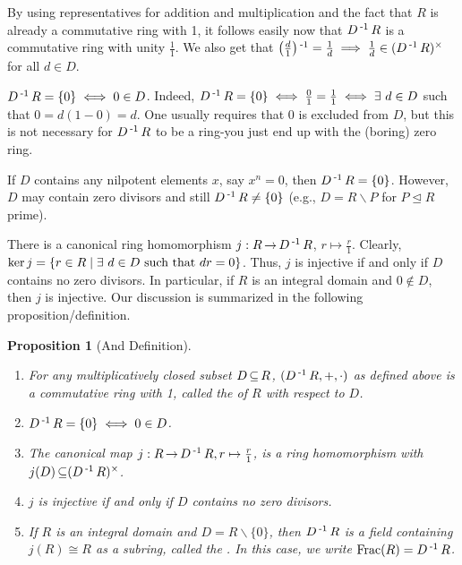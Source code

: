 \documentclass[11pt]{book}
\newcounter{counter}
\newtheorem{proposition}[counter]{Proposition}   \newtheorem{problem}[counter]{Problem}   \newtheorem*{proposition*}{Proposition}   \newtheorem*{lemma*}{Lemma}
\theoremstyle{definition}   \newtheorem{defn}[counter]{Definition} %
\newcommand{\bs}{\backslash}   \newcommand{\A}{\mathcal{A}}   \newcommand{\sy}{\textnormal{Syl}}   \newcommand{\size}[1]{\left| #1 \right|}
\newcommand{\nsg}{\mathrel{\unlhd}}   \newcommand{\ind}{\parindent24pt}   \newcommand{\vn}{\varnothing}
\DeclareMathOperator{\ra}{\rightarrow}   \DeclareMathOperator{\Poly}{\mathbf{P}}   \DeclareMathOperator{\spn}{\textnormal{span}}   \DeclareMathOperator{\aut}{\textnormal{Aut}}
\newcommand{\vs}{\vspace{8pt}}
\numberwithin{counter}{chapter}
\begin{document}
By using representatives for addition and multiplication and the fact that $R$ is already a commutative ring with 1, it follows easily now that $D\operatorname{^{-1}} R$ is a commutative ring with unity $\frac{1}{1}$. We also get that $\left( \frac{d}{1} \right)\operatorname{^{-1}} = \frac{1}{d} \implies \frac{1}{d} \in (D\operatorname{^{-1}} R)^{\times}$ for all $d \in D$.

\vs

\begin{remark*}
$D\operatorname{^{-1}} R = \{0\} \iff 0 \in D$. Indeed, $D\operatorname{^{-1}} R = \{0\} \iff \frac{0}{1} = \frac{1}{1} \iff \exists \ d \in D$ such that $0 = d(1-0) = d$. One usually requires that $0$ is excluded from $D$, but this is not necessary for $D\operatorname{^{-1}} R$ to be a ring-you just end up with the (boring) zero ring.

If $D$ contains any nilpotent elements $x$, say $x^n = 0$, then $D\operatorname{^{-1}} R = \{0\}$. However, $D$ may contain zero divisors and still $D\operatorname{^{-1}} R \ne \{0\}$ (e.g., $D = R \bs P$ for $P \nsg R$ prime).
\end{remark*}

\vs

There is a canonical ring homomorphism $j : R \ra D\inv R$, $r \mapsto \frac{r}{1}$. Clearly, $\ker j = \{r \in R \mid \exists \ d \in D \textnormal{ such that } dr = 0\}$. Thus, $j$ is injective if and only if $D$ contains no zero divisors. In particular, if $R$ is an integral domain and $0 \notin D$, then $j$ is injective. Our discussion is summarized in the following proposition/definition.

\vs

\begin{proposition}[And Definition]
\
\begin{enumerate}
\item[(a)] For any multiplicatively closed subset $D \operatorname{\subseteq} R$, $(D\operatorname{^{-1}} R, +, \cdot)$ as defined above is a commutative ring with 1, called the  of $R$ with respect to $D$.
\item[(b)] $D\operatorname{^{-1}} R = \{0\} \iff 0 \in D$.
\item[(c)] The canonical map $j : R \ra D\inv R, r \mapsto \frac{r}{1}$, is a ring homomorphism with $j(D) \operatorname{\subseteq} (D\operatorname{^{-1}} R)^{\times}$.
\item[(d)] $j$ is injective if and only if $D$ contains no zero divisors.
\item[(e)] If $R$ is an integral domain and $D = R\bs\{0\}$, then $D\operatorname{^{-1}} R$ is a field containing $j(R) \cong R$ as a subring, called the . In this case, we write $\textnormal{Frac}(R) = D\operatorname{^{-1}} R$.
\end{enumerate}
\end{proposition}
\end{document}
